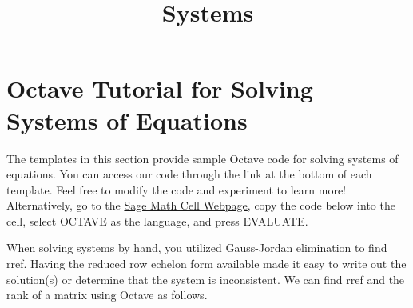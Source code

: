\documentclass{ximera}
\title{Systems} \license{CC BY-NC-SA 4.0}
\begin{document}
\begin{abstract}
\end{abstract}
\maketitle

\section*{Octave Tutorial for Solving Systems of Equations}

The templates in this section provide sample Octave code for solving systems of equations. You can access our code through the link at the bottom of each template.  Feel free to modify the code and experiment to learn more!  Alternatively, go to the \href{https://sagecell.sagemath.org/}{Sage Math Cell Webpage}, copy the code below into the cell, select OCTAVE as the language, and press EVALUATE.  


When solving systems by hand, you utilized Gauss-Jordan elimination to find rref.  Having the reduced row echelon form available made it easy to write out the solution(s) or determine that the system is inconsistent.  We can find rref and the rank of a matrix using Octave as follows.
\end{document}
